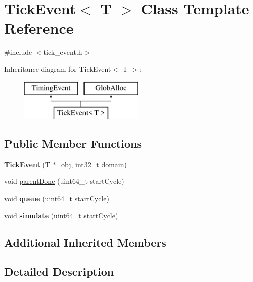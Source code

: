 \hypertarget{classTickEvent}{\section{Tick\-Event$<$ T $>$ Class Template Reference}
\label{classTickEvent}
}


{\ttfamily \#include $<$tick\-\_\-event.\-h$>$}

Inheritance diagram for Tick\-Event$<$ T $>$\-:\begin{figure}[H]
\begin{center}
\leavevmode
\includegraphics[height=2.000000cm]{classTickEvent}
\end{center}
\end{figure}
\subsection*{Public Member Functions}
\begin{DoxyCompactItemize}
\item 
\hypertarget{classTickEvent_ab6621bb33df2dd1e13cb3af454c60414}{{\bfseries Tick\-Event} (T $\ast$\-\_\-obj, int32\-\_\-t domain)}\label{classTickEvent_ab6621bb33df2dd1e13cb3af454c60414}

\item 
void \hyperlink{classTickEvent_ab044a76691e38747e8a1a4106910fcab}{parent\-Done} (uint64\-\_\-t start\-Cycle)
\item 
\hypertarget{classTickEvent_a0adf11e849f6ea0a173d317ea3b60945}{void {\bfseries queue} (uint64\-\_\-t start\-Cycle)}\label{classTickEvent_a0adf11e849f6ea0a173d317ea3b60945}

\item 
\hypertarget{classTickEvent_abc514f421a56a13407269b6ecef4396b}{void {\bfseries simulate} (uint64\-\_\-t start\-Cycle)}\label{classTickEvent_abc514f421a56a13407269b6ecef4396b}

\end{DoxyCompactItemize}
\subsection*{Additional Inherited Members}


\subsection{Detailed Description}
